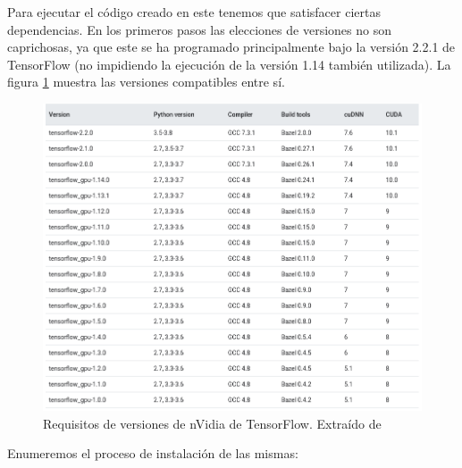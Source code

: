 \documentclass[../main.tex]{subfiles}
\begin{document}
Para ejecutar el código creado en este \tfg tenemos que satisfacer ciertas dependencias. En los primeros pasos las elecciones de versiones no son caprichosas, ya que este \tfg se ha programado principalmente bajo la versión 2.2.1 de TensorFlow (no impidiendo la ejecución de la versión 1.14 también utilizada). La figura \ref{fig:cuadro_versiones_tensorflow_cuda} muestra las versiones compatibles entre sí.

\begin{figure}[h!]
    \centering
    \includegraphics[width=1\textwidth]{imagenes/cuadro_versiones_tensorflow_cuda.png}
    \caption[Requisitos de versiones de nVidia de TensorFlow]{Requisitos de versiones de nVidia de TensorFlow. Extraído de \cite{StackOverflow2018}}
    \label{fig:cuadro_versiones_tensorflow_cuda}
\end{figure}

Enumeremos el proceso de instalación de las mismas:
\end{document}

